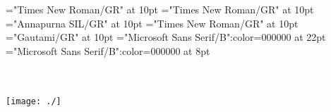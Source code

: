 \documentclass[a4paper]{article}
\begin{document}
\font\sppictureCaptionpictureRightentryletDatadicBody="Times New Roman/GR" at 10pt
\font\pictureLabelenpictureCaptionpictureRightentryletDatadicBody="Times New Roman/GR" at 10pt
\font\LexSensepublishStemGlossPubLehientryletDatadicBody="Annapurna SIL/GR" at 10pt
\font\xitemcenentryletDatadicBody="Times New Roman/GR" at 10pt
\font\xitemcteentryletDatadicBody="Gautami/GR" at 10pt
\color{black} 
\thispagestyle{empty} 
\font\CoverPageTitle="Microsoft Sans Serif/B":color=000000 at 22pt 
\font\pFrontMatterdiv="Microsoft Sans Serif/B":color=000000 at 8pt 
\vskip 60pt 
\begin{center} 
\end{center} 
\newpage 
\newpage 
\thispagestyle{empty} 
\mbox{} 
\begin{titlepage}
\begin{center}
\textsc{\LARGE {}}\\[1.5cm] 
\vspace{110 mm} 
\textsc{ }\\[0.5cm] 
\texttt{[image: ./]}\\[1cm]    
\end{center} 
\end{titlepage} 
\setcounter{page}{3} 
 
\pagestyle{plain} 
\newpage 






\newpage 

\mbox{} 
\newpage 
\newpage 
\setcounter{page}{1} 
\pagestyle{plain} 
\tableofcontents 
\newpage 
\end{document}
